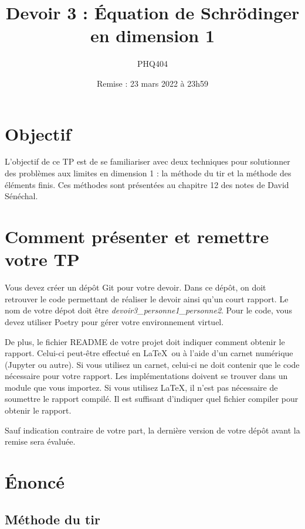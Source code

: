 \documentclass{article}
\begin{document}
\title{Devoir 3 : Équation de Schrödinger en dimension 1} 
\author{PHQ404} 
\date{Remise : 23 mars 2022 à 23h59}
\maketitle

\section{Objectif}

L’objectif de ce TP est de se familiariser avec deux techniques pour solutionner des problèmes aux limites
en dimension 1 : la méthode du tir et la méthode des éléments finis.
Ces méthodes sont présentées au chapitre 12 des notes de David Sénéchal.

\section{Comment présenter et remettre votre TP}

Vous devez créer un dépôt Git pour votre devoir.
Dans ce dépôt, on doit retrouver le code permettant de réaliser le devoir 
ainsi qu'un court rapport. 
Le nom de votre dépot doit être \textit{devoir3\_personne1\_personne2}.
Pour le code, vous devez utiliser Poetry pour gérer votre environnement virtuel.

De plus, le fichier README de votre projet doit indiquer comment obtenir le rapport.
Celui-ci peut-être effectué en \LaTeX\ ou à l'aide d'un carnet numérique (Jupyter ou autre).
Si vous utilisez un carnet, celui-ci ne doit contenir que le code nécessaire pour votre rapport.
Les implémentations doivent se trouver dans un module que vous importez.
Si vous utilisez \LaTeX, il n'est pas nécessaire de soumettre le rapport compilé.
Il est suffisant d'indiquer quel fichier compiler pour obtenir le rapport.

Sauf indication contraire de votre part, 
la dernière version de votre dépôt avant la remise sera évaluée.

\section{Énoncé}

\subsection{Méthode du tir} 
\end{document}
